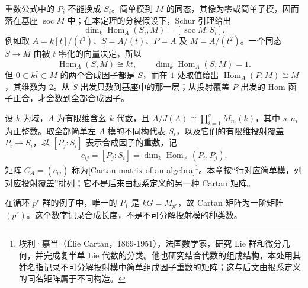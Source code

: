 \ProseParagraphBreak

重数公式中的 \(P_i\) 不能换成 \(S_i\)。简单模到 \(M\) 的同态，其像为零或简单子模，因而落在基座 \(\operatorname{soc}M\) 中；在本定理的分裂假设下，Schur 引理给出
\[
	\dim_k\operatorname{Hom}_A(S_i,M) =[\operatorname{soc}M:S_i].
\]
例如取 \(A=k[t]/(t^3)\)、\(S=A/(t)\)、\(P=A\) 及 \(M=A/(t^2)\)。一个同态 \(S\to M\) 由被 \(t\) 零化的向量决定，所以
\[
	\operatorname{Hom}_A(S,M)\cong k\bar t,\qquad \dim_k\operatorname{Hom}_A(S,M)=1.
\]
但 \(0\subset k\bar t\subset M\) 的两个合成因子都是 \(S\)，而在 \(1\) 处取值给出 \(\operatorname{Hom}_A(P,M)\cong M\)，其维数为 \(2\)。从 \(S\) 出发只数到基座中的那一层；从投射覆盖 \(P\) 出发的 Hom 函子正合，才会数到全部合成因子。
\begin{definition}\label{b5:def:modular-cartan-matrix}
	设 \(k\) 为域，\(A\) 为有限维含幺 \(k\) 代数，且 \(A/J(A)\cong\prod_{i=1}^sM_{n_i}(k)\)，其中 \(s,n_i\) 为正整数。取全部简单左 \(A\)-模的不同构代表 \(S_i\)，以及它们的有限维投射覆盖 \(P_i\to S_i\)，以 \([P_j:S_i]\) 表示合成因子的重数，记
	\[
		c_{ij}=[P_j:S_i]=\dim_k\operatorname{Hom}_A(P_i,P_j).
	\]
	矩阵 \(C_A=(c_{ij})\) 称为[Cartan matrix of an algebra]\footnote{埃利·嘉当（Élie Cartan，1869-1951），法国数学家，研究 Lie 群和微分几何，并完成复半单 Lie 代数的分类。他也研究结合代数的组成结构，本处用其姓名指记录不可分解投射模中简单组成因子重数的矩阵；这与后文由根系定义的同名矩阵属于不同构造。}。本章按“行对应简单模，列对应投射覆盖”排列；它不是后来由根系定义的另一种 Cartan 矩阵。
\end{definition}
在循环 \(p^r\) 群的例子中，唯一的 \(P_1\) 是 \(kG=M_{p^r}\)，故 Cartan 矩阵为一阶矩阵 \((p^r)\)。这个数字记录合成长度，不是不可分解投射模的种类数。

